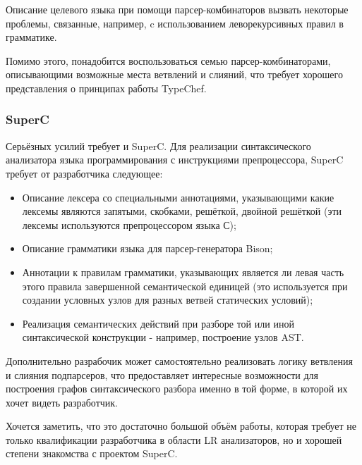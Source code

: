 Описание целевого языка при помощи парсер-комбинаторов вызвать некоторые проблемы, связанные, например, c использованием леворекурсивных правил в грамматике. 

Помимо этого, понадобится воспользоваться семью парсер-комбинаторами, описывающими возможные места ветвлений и слияний, что требует хорошего представления о принципах работы TypeChef.

\subsubsection{SuperC}

Серьёзных усилий требует и SuperC. Для реализации синтаксического анализатора языка программирования с инструкциями препроцессора, SuperC требует от разработчика следующее:

\begin{itemize}
\item Описание лексера со специальными аннотациями, указывающими какие лексемы являются запятыми, скобками, решёткой, двойной решёткой (эти лексемы используются препроцессором языка С);
\item Описание грамматики языка для парсер-генератора Bison;
\item Аннотации к правилам грамматики, указывающих является ли левая часть этого правила завершенной семантической единицей (это используется при создании условных узлов для разных ветвей статических условий);
\item Реализация семантических действий при разборе той или иной синтаксической конструкции - например, построение узлов AST.
\end{itemize}

Дополнительно разрабочик может самостоятельно реализовать логику ветвления и слияния подпарсеров, что предоставляет интересные возможности для построения графов синтаксического разбора именно в той форме, в которой их хочет видеть разработчик.

Хочется заметить, что это достаточно большой объём работы, которая требует не только квалификации разработчика в области LR анализаторов, но и хорошей степени знакомства с проектом SuperC.

